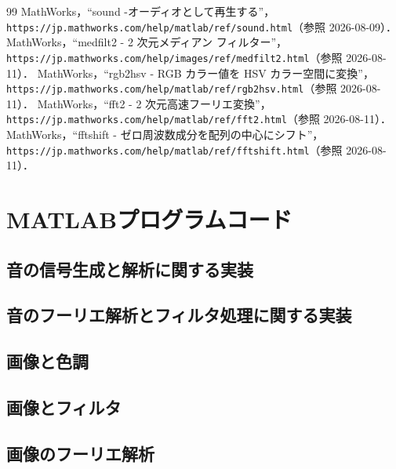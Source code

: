 \documentclass[paper=a4, fontsize=10pt]{jlreq}
\begin{document}
\begin{thebibliography}{99}
   MathWorks，``sound -オーディオとして再生する''，\texttt{https://jp.mathworks.com/help/matlab/ref/sound.html}（参照 2026-08-09）．
     MathWorks，``medfilt2 - 2 次元メディアン フィルター''，\texttt{https://jp.mathworks.com/help/images/ref/medfilt2.html}（参照 2026-08-11）．
 MathWorks，``rgb2hsv - RGB カラー値を HSV カラー空間に変換''，\texttt{https://jp.mathworks.com/help/matlab/ref/rgb2hsv.html}（参照 2026-08-11）．
 MathWorks，``fft2 - 2 次元高速フーリエ変換''，\texttt{https://jp.mathworks.com/help/matlab/ref/fft2.html}（参照 2026-08-11）．
   MathWorks，``fftshift - ゼロ周波数成分を配列の中心にシフト''，\texttt{https://jp.mathworks.com/help/matlab/ref/fftshift.html}（参照 2026-08-11）．
\end{thebibliography}

\appendix
\section{MATLABプログラムコード}

\subsection{音の信号生成と解析に関する実装}
\label{sec:appendix_class1}


\subsection{音のフーリエ解析とフィルタ処理に関する実装}
\label{sec:appendix_class2}


\subsection{画像と色調}
\label{sec:appendix_class3}


\subsection{画像とフィルタ}
\label{sec:appendix_class4}


\subsection{画像のフーリエ解析}
\label{sec:appendix_class5}

\end{document}
